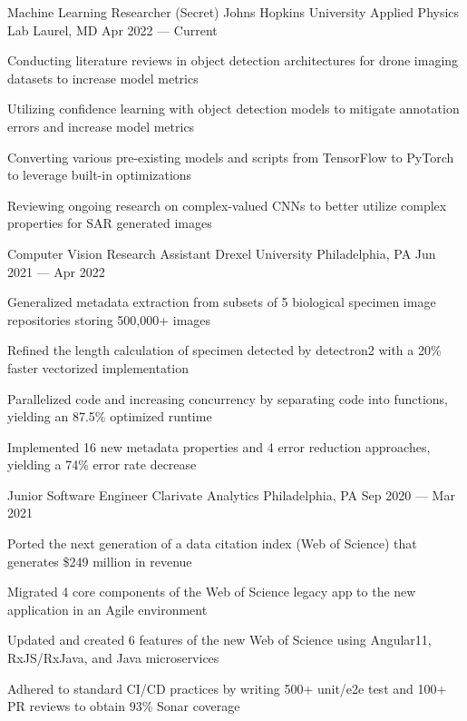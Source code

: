 
\begin{cventries}

    \cventry
    {Machine Learning Researcher (Secret)} %
    {Johns Hopkins University Applied Physics Lab} %
    {Laurel, MD} %
    {Apr 2022 --- Current} %
    {
      \begin{cvitems} %
        \item{Conducting literature reviews in object detection architectures for drone imaging datasets to increase  model metrics}
        \item{Utilizing confidence learning with object detection models to mitigate annotation errors and increase model metrics}
        \item{Converting various pre-existing models and scripts from TensorFlow to PyTorch to leverage built-in optimizations}
        \item{Reviewing ongoing research on complex-valued CNNs to better utilize complex properties for SAR generated images}
      \end{cvitems}
    }

  \cventry
    {Computer Vision Research Assistant} %
    {Drexel University} %
    {Philadelphia, PA} %
    {Jun 2021 --- Apr 2022} %
    {
      \begin{cvitems} %
        \item{Generalized metadata extraction from subsets of 5 biological specimen image repositories storing 500,000+ images}
        \item{Refined the length calculation of specimen detected by detectron2 with a 20\% faster vectorized implementation}
        \item{Parallelized code and increasing concurrency by separating code into functions, yielding an 87.5\% optimized runtime}
        \item{Implemented 16 new metadata properties and 4 error reduction approaches, yielding a 74\% error rate decrease}
      \end{cvitems}
    }
    
  \cventry
    {Junior Software Engineer} %
    {Clarivate Analytics} %
    {Philadelphia, PA} %
    {Sep 2020 --- Mar 2021} %
    {
      \begin{cvitems} %
        \item{Ported the next generation of a data citation index (Web of Science) that generates \$249 million in revenue}
        \item{Migrated 4 core components of the Web of Science legacy app to the new application in an Agile environment}
        \item{Updated and created 6 features of the new Web of Science using Angular11, RxJS/RxJava, and Java microservices}
        \item{Adhered to standard CI/CD practices by writing 500+ unit/e2e test and 100+ PR reviews to obtain 93\% Sonar coverage}
      \end{cvitems}
    }
    

\end{cventries}

